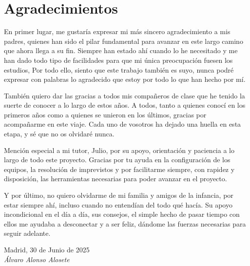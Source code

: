 \cleardoublepage

\chapter*{Agradecimientos}

En primer lugar, me gustaría expresar mi más sincero agradecimiento a mis padres, quienes han sido el pilar fundamental para avanzar en este largo camino que ahora llega a su fin. Siempre han estado ahí cuando lo he necesitado y me han dado todo tipo de facilidades para que mi única preocupación fuesen los estudios, Por todo ello, siento que este trabajo también es suyo, nunca podré expresar con palabras lo agradecido que estoy por todo lo que han hecho por mí.

También quiero dar las gracias a todos mis compañeros de clase que he tenido la suerte de conocer a lo largo de estos años. A todos, tanto a quienes conocí en los primeros años como a quienes se unieron en los últimos, gracias por acompañarme en este viaje. Cada uno de vosotros ha dejado una huella en esta etapa, y sé que no os olvidaré nunca.

Mención especial a mi tutor, Julio, por su apoyo, orientación y paciencia a lo largo de todo este proyecto. Gracias por tu ayuda en la configuración de los equipos, la resolución de imprevistos y por facilitarme siempre, con rapidez y disposición, las herramientas necesarias para poder avanzar en el proyecto.

Y por último, no quiero olvidarme de mi familia y amigos de la infancia, por estar siempre ahí, incluso cuando no entendían del todo qué hacía. Su apoyo incondicional en el día a día, sus consejos, el simple hecho de pasar tiempo con ellos me ayudaba a desconectar y a ser feliz, dándome las fuerzas necesarias para seguir adelante.


\begin{flushright}
		\vspace{2.0 cm}
		Madrid, 30 de Junio de 2025\\ %
		\emph{Álvaro Alonso Alosete}
\end{flushright}

\thispagestyle{empty}

